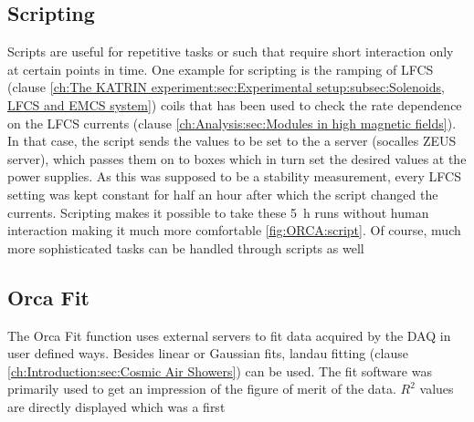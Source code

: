     \subsection{Scripting}
    \label{ch:The muon detection system:sec:OrcaControl:subsec:Scripting}
    Scripts are useful for repetitive tasks or such that require short interaction only at certain points in time. One example for scripting is the ramping of LFCS (clause \ref{ch:The KATRIN experiment:sec:Experimental setup:subsec:Solenoids, LFCS and EMCS system}) coils that has been used to check the rate dependence on the LFCS currents (clause \ref{ch:Analysis:sec:Modules in high magnetic fields}). In that case, the script sends the values to be set to the a server (socalles ZEUS server), which passes them on to  boxes which in turn set the desired values at the power supplies. As this was supposed to be a stability measurement, every LFCS setting was kept constant for half an hour after which the script changed the currents. Scripting makes it possible to take these \SI{5}{\hour} runs without human interaction making it much more comfortable \ref{fig:ORCA:script}. Of course, much more sophisticated tasks can be handled through scripts as well
    
    \subsection{Orca Fit}
    \label{ch:The muon detection system:sec:OrcaControl:subsec:OrcaFit}
    The Orca Fit function uses external servers to fit data acquired by the DAQ in user defined ways. Besides linear or Gaussian fits, landau fitting (clause \ref{ch:Introduction:sec:Cosmic Air Showers}) can be used. The fit software was primarily used to get an impression of the figure of merit of the data. $R^2$ values are directly displayed which was a first 
  
  

